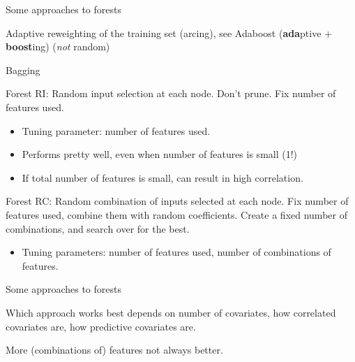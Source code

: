 \documentclass[xcolor={table}, handout]{beamer}
\begin{document}
\begin{frame}{Some approaches to forests}

\begin{wideitemize}
\item Adaptive reweighting of the training set (arcing), see Adaboost (\textcolor{Contrast4}{\textbf{ada}}ptive + \textcolor{Contrast4}{\textbf{boost}}ing) \citep{freund1996experiments} \pause (\textit{not} random)\pause
\item Bagging \pause
\item Forest RI: Random input selection at each node. \pause Don't prune. \pause Fix number of features used. \pause
\begin{itemize}
\item Tuning parameter: number of features used. \pause
\item Performs pretty well, even when number of features is small (1!)\pause
\item If total number of features is small, can result in high correlation. 
\end{itemize}\pause
\item Forest RC: Random combination of inputs selected at each node. \pause Fix number of features used, combine them with random coefficients. \pause Create a fixed number of combinations, and search over for the best.\pause
\begin{itemize}
\item Tuning parameters: number of features used, number of combinations of features. 
\end{itemize}
\end{wideitemize}

\end{frame}



\begin{frame}{Some approaches to forests}

\begin{wideitemize}
\item Which approach works best depends on number of covariates, how correlated covariates are, how predictive covariates are. \pause
\item More (combinations of) features not always better. 
\end{wideitemize}

\end{frame}
\end{document}
